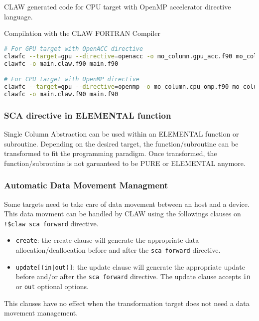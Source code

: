 CLAW generated code for CPU target with OpenMP accelerator directive language.


Compilation with the CLAW FORTRAN Compiler
\begin{lstlisting}[language=bash]
# For GPU target with OpenACC directive
clawfc --target=gpu --directive=openacc -o mo_column.gpu_acc.f90 mo_column.f90
clawfc -o main.claw.f90 main.f90

# For CPU target with OpenMP directive
clawfc --target=gpu --directive=openmp -o mo_column.cpu_omp.f90 mo_column.f90
clawfc -o main.claw.f90 main.f90
\end{lstlisting}

\subsubsection{SCA directive in ELEMENTAL function}
Single Column Abstraction can be used within an ELEMENTAL function or
subroutine. Depending on the desired target, the function/subroutine can be
transformed to fit the programming paradigm. Once transformed, the
function/subroutine is not garuanteed to be PURE or ELEMENTAL anymore.


\subsubsection{Automatic Data Movement Managment}
Some targets need to take care of data movement between an host and a device.
This data movment can be handled by CLAW using the followings clauses on
\lstinline|!$claw sca forward| directive.%

\begin{itemize}
  \item \lstinline|create|: the create clause will generate the appropriate
        data allocation/deallocation before and after the
        \lstinline|sca forward| directive.
  \item \lstinline!update[(in|out)]!: the update clause will generate the appropriate
        update before and/or after the \lstinline|sca forward| directive. The
        update clause accepts \lstinline|in| or \lstinline|out| optional
        options.
\end{itemize}

This clauses have no effect when the transformation target does not need a
data movement management.
